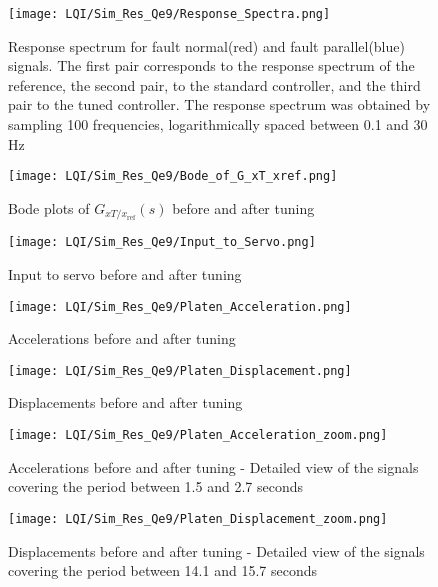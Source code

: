 \begin{figure}[H]
    \centering
    \texttt{[image: LQI/Sim\_Res\_Qe9/Response\_Spectra.png]}
    \caption{Response spectrum for fault normal(red) and fault parallel(blue) signals. The first pair corresponds to the response spectrum of the reference, the second pair, to the standard controller, and the third pair to the tuned controller. The response spectrum was obtained by sampling 100 frequencies, logarithmically spaced between 0.1 and 30 Hz}%
    \label{fig_response_spectrum_of_3}
\end{figure}


\begin{figure}[H]
\begin{minipage}{0.49\textwidth}
    \centering
    \texttt{[image: LQI/Sim\_Res\_Qe9/Bode\_of\_G\_xT\_xref.png]}
    \caption{Bode plots of $G_ {xT/x_{\text{ref}}}(s)$ before and after tuning}
    \label{fig_Bode_of_G_xT_xref}    
\end{minipage}
\hfill
\begin{minipage}{0.49\textwidth}
    \centering
    \texttt{[image: LQI/Sim\_Res\_Qe9/Input\_to\_Servo.png]}
    \caption{Input to servo before and after tuning}
    \label{fig_Input_to_Servo}
\end{minipage}
\end{figure}


\begin{figure}[H]
\begin{minipage}{0.49\textwidth}
    \centering
    \texttt{[image: LQI/Sim\_Res\_Qe9/Platen\_Acceleration.png]}
    \caption{Accelerations before and after tuning}
    \label{fig_Platen_Acceleration}
\end{minipage}
\hfill
\begin{minipage}{0.49\textwidth}
    \centering
    \texttt{[image: LQI/Sim\_Res\_Qe9/Platen\_Displacement.png]}
    \caption{Displacements before and after tuning}
    \label{fig_Platen_Displacement}
\end{minipage}
\end{figure}

\begin{figure}[H]
\begin{minipage}{0.49\textwidth}
    \centering
    \texttt{[image: LQI/Sim\_Res\_Qe9/Platen\_Acceleration\_zoom.png]}
    \caption{Accelerations before and after tuning - Detailed view of the signals covering the period between 1.5 and 2.7 seconds}
    \label{fig_Platen_Acceleration_zoom}
\end{minipage}
\hfill
\begin{minipage}{0.49\textwidth}
    \centering
    \texttt{[image: LQI/Sim\_Res\_Qe9/Platen\_Displacement\_zoom.png]}
    \caption{Displacements before and after tuning - Detailed view of the signals covering the period between 14.1 and 15.7 seconds}
    \label{fig_Platen_Displacement_zoom}
\end{minipage}
\end{figure}

